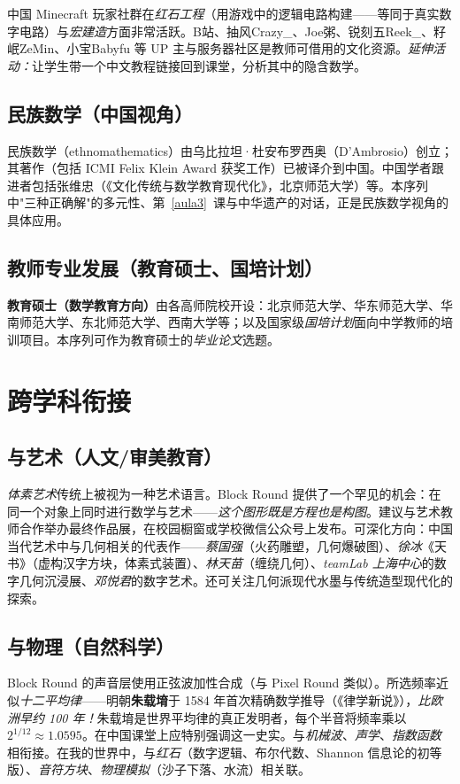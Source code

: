\documentclass[12pt,a4paper]{scrartcl}
\newcommand{\acc}[1]{\textcolor{accent}{\textbf{#1}}}
\begin{document}
中国 Minecraft 玩家社群在\emph{红石工程}（用游戏中的逻辑电路构建——等同于真实数字电路）与\emph{宏建造}方面非常活跃。B站、抽风Crazy\_、Joe粥、锐刻五Reek\_、籽岷ZeMin、小宝Babyfu 等 UP 主与服务器社区是教师可借用的文化资源。\emph{延伸活动：}让学生带一个中文教程链接回到课堂，分析其中的隐含数学。

\subsection{民族数学（中国视角）}

民族数学（ethnomathematics）由乌比拉坦·杜安布罗西奥（D'Ambrosio）创立；其著作（包括 ICMI Felix Klein Award 获奖工作）已被译介到中国。中国学者跟进者包括张维忠（《文化传统与数学教育现代化》，北京师范大学）等。本序列中"三种正确解"的多元性、第~\ref{aula3}~课与中华遗产的对话，正是民族数学视角的具体应用。

\subsection{教师专业发展（教育硕士、国培计划）}

\acc{教育硕士（数学教育方向）}由各高师院校开设：北京师范大学、华东师范大学、华南师范大学、东北师范大学、西南大学等；以及国家级\emph{国培计划}面向中学教师的培训项目。本序列可作为教育硕士的\emph{毕业论文}选题。

\section{跨学科衔接}\label{sec:interdisc}

\subsection{与艺术（人文/审美教育）}
\emph{体素艺术}传统上被视为一种艺术语言。Block Round 提供了一个罕见的机会：在同一个对象上同时进行数学与艺术——\emph{这个图形既是方程也是构图}。建议与艺术教师合作举办最终作品展，在校园橱窗或学校微信公众号上发布。可深化方向：中国当代艺术中与几何相关的代表作——\emph{蔡国强}（火药雕塑，几何爆破图）、\emph{徐冰}《天书》（虚构汉字方块，体素式装置）、\emph{林天苗}（缠绕几何）、\emph{teamLab 上海中心}的数字几何沉浸展、\emph{邓悦君}的数字艺术。还可关注几何派现代水墨与传统造型现代化的探索。

\subsection{与物理（自然科学）}
Block Round 的声音层使用正弦波加性合成（与 Pixel Round 类似）。所选频率近似\emph{十二平均律}——明朝\acc{朱载堉}于 1584 年首次精确数学推导（《律学新说》），\emph{比欧洲早约 100 年！}朱载堉是世界平均律的真正发明者，每个半音将频率乘以 $2^{1/12} \approx 1.0595$。在中国课堂上应特别强调这一史实。与\emph{机械波}、\emph{声学}、\emph{指数函数}相衔接。在我的世界中，与\emph{红石}（数字逻辑、布尔代数、Shannon 信息论的初等版）、\emph{音符方块}、\emph{物理模拟}（沙子下落、水流）相关联。
\end{document}
